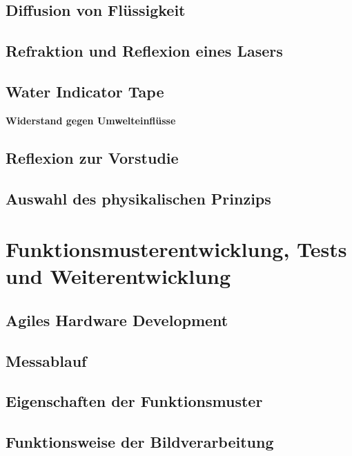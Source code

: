 \documentclass[a4paper,12pt]{article}
\begin{document}
\newpage
\subsection{Diffusion von Flüssigkeit}
\label{sec:TinteVersuchsaufbau}

\newpage

\subsection{Refraktion und Reflexion eines Lasers}


\subsection{Water Indicator Tape}
\label{sec:5559}


\newpage
\textbf{Widerstand gegen Umwelteinflüsse}

\newpage
\subsection{Reflexion zur Vorstudie}



\subsection{Auswahl des physikalischen Prinzips}

\newpage
\section{Funktionsmusterentwicklung, Tests und Weiterentwicklung}


\subsection{Agiles Hardware Development}


\newpage
\subsection{Messablauf}
\label{sec:Mess}


\subsection{Eigenschaften der Funktionsmuster}
\label{sec:EigenFunk}


\newpage
\subsection{Funktionsweise der Bildverarbeitung}

\end{document}
